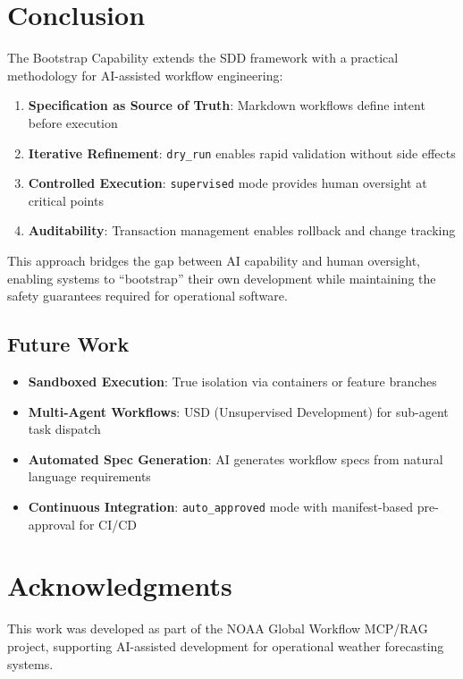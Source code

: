 \documentclass[11pt,letterpaper]{article}
\begin{document}
\section{Conclusion}

The Bootstrap Capability extends the SDD framework with a practical methodology for AI-assisted workflow engineering:

\begin{enumerate}
    \item \textbf{Specification as Source of Truth}: Markdown workflows define intent before execution
    \item \textbf{Iterative Refinement}: \texttt{dry\_run} enables rapid validation without side effects
    \item \textbf{Controlled Execution}: \texttt{supervised} mode provides human oversight at critical points
    \item \textbf{Auditability}: Transaction management enables rollback and change tracking
\end{enumerate}

This approach bridges the gap between AI capability and human oversight, enabling systems to ``bootstrap'' their own development while maintaining the safety guarantees required for operational software.

\subsection{Future Work}

\begin{itemize}
    \item \textbf{Sandboxed Execution}: True isolation via containers or feature branches
    \item \textbf{Multi-Agent Workflows}: USD (Unsupervised Development) for sub-agent task dispatch
    \item \textbf{Automated Spec Generation}: AI generates workflow specs from natural language requirements
    \item \textbf{Continuous Integration}: \texttt{auto\_approved} mode with manifest-based pre-approval for CI/CD
\end{itemize}


\section*{Acknowledgments}

This work was developed as part of the NOAA Global Workflow MCP/RAG project, supporting AI-assisted development for operational weather forecasting systems.
\end{document}
